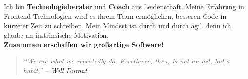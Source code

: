 \documentclass[9pt]{developercv} %
\newenvironment{itquote}
{\begin{quote}\itshape}
{\end{quote}}
\begin{document}

\begin{minipage}[t]{0.4\textwidth} %
	\vspace{-\baselineskip} %
  Ich bin \textbf{Technologieberater} und \textbf{Coach} aus Leidenschaft.
  Meine Erfahrung in Frontend Technologien wird es ihrem Team ermöglichen, besseren Code in kürzerer Zeit zu schreiben.
  Mein Mindset ist durch und durch agil, denn ich glaube an instrinsische Motivation.\\
  \textbf{Zusammen erschaffen wir großartige Software!}
  \begin{itquote} 
    ``We are what we repeatedly do. Excellence, then, is not an act, but a habit.'' -- 
    \href{https://medium.com/the-mission/my-favourite-quote-of-all-time-is-a-misattribution-66356f22843d}{Will Durant}\\
  \end{itquote}
\end{minipage}
\hfill %
\begin{minipage}[t]{0.5\textwidth} %
	\vspace{-\baselineskip} %
	\begin{barchart}{5.5}
	\end{barchart}
  \vspace{0.4cm}
\end{minipage}

\begin{center}
\end{center}


\end{document}
